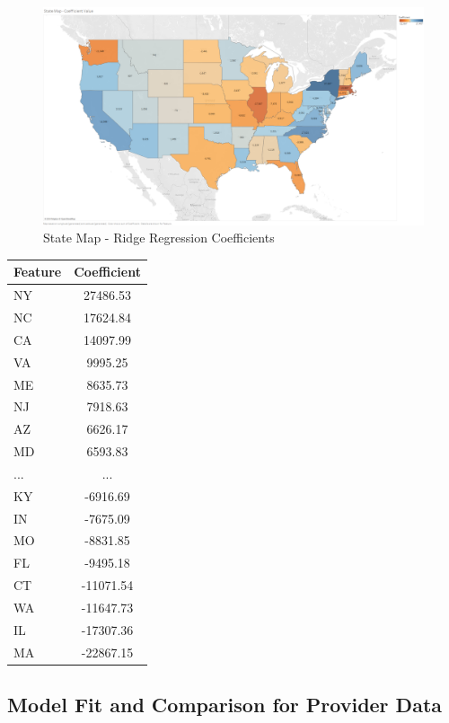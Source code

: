 \documentclass{article}
\theoremstyle{mytheoremstyle}
\theoremstyle{mytheoremstyle}
\theoremstyle{myproblemstyle}
\begin{document}
\begin{figure}[htbp]
\centering
\includegraphics[width=\linewidth]{Images/State Map - Coefficient Value.png}
\caption{State Map - Ridge Regression Coefficients}
\label{fig:Robust Scaler Results}
\end{figure}

\begin{table}[htbp]
\centering
\label{tab:feature_importance}
\begin{tabular}{lc}
\toprule
Feature & {Coefficient} \\
\midrule
NY & 27486.53 \\
NC & 17624.84 \\
CA & 14097.99 \\
VA & 9995.25 \\
ME & 8635.73 \\
NJ & 7918.63 \\
AZ & 6626.17 \\
MD & 6593.83 \\
... & ... \\
KY & -6916.69 \\
IN & -7675.09 \\
MO & -8831.85 \\
FL & -9495.18 \\
CT & -11071.54 \\
WA & -11647.73 \\
IL & -17307.36 \\
MA & -22867.15 \\


\bottomrule
\end{tabular}
\end{table}

\pagebreak



\subsection{Model Fit and Comparison for Provider Data}
\end{document}
